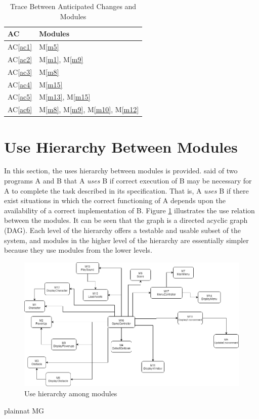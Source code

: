 \documentclass[12pt, titlepage]{article}
\newcommand{\acref}[1]{AC\ref{#1}}
\newcommand{\mref}[1]{M\ref{#1}}
\begin{document}
\begin{table}[H]
\centering
\begin{tabular}{p{} p{}}
\toprule
\textbf{AC} & \textbf{Modules}\\
\midrule
\acref{ac1} & \mref{m5}\\
\acref{ac2} & \mref{m1}, \mref{m9}\\
\acref{ac3} & \mref{m8}\\
\acref{ac4} & \mref{m15}\\
\acref{ac5} & \mref{m13}, \mref{m15}\\
\acref{ac6} & \mref{m8}, \mref{m9}, \mref{m10}, \mref{m12}\\
\bottomrule
\end{tabular}
\caption{Trace Between Anticipated Changes and Modules}
\label{TblACT}
\end{table}

\section{Use Hierarchy Between Modules} \label{SecUse}

In this section, the uses hierarchy between modules is
provided. \citet{Parnas1978} said of two programs A and B that A {\em uses} B if
correct execution of B may be necessary for A to complete the task described in
its specification. That is, A {\em uses} B if there exist situations in which
the correct functioning of A depends upon the availability of a correct
implementation of B.  Figure \ref{FigUH} illustrates the use relation between
the modules. It can be seen that the graph is a directed acyclic graph
(DAG). Each level of the hierarchy offers a testable and usable subset of the
system, and modules in the higher level of the hierarchy are essentially simpler
because they use modules from the lower levels.

\begin{figure}[H]
\centering
\includegraphics[width=1\textwidth]{Module Hiearchy.png}
\caption{Use hierarchy among modules}
\label{FigUH}
\end{figure}


 {plainnat}
 {MG}
\end{document}
